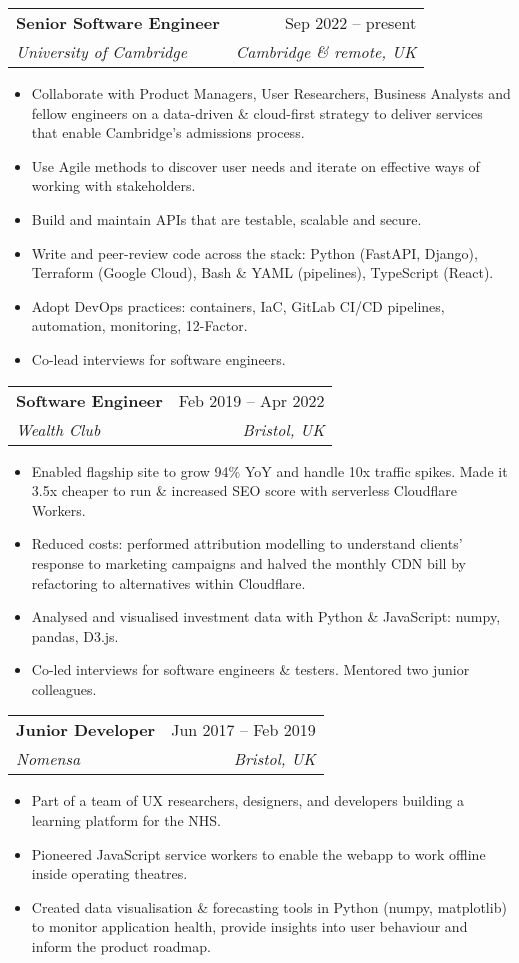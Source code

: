 \documentclass[a4paper,12pt]{article}
\makeatletter
\newcommand{\resumeItem}[1]{
  \item\small{
    {#1 \vspace{-2pt}}
  }
}
\newcommand{\resumeSubheading}[4]{
  \vspace{-2pt}\item
    \begin{tabular*}{0.97\textwidth}[t]{l@{\extracolsep{\fill}}r}
      \textbf{#1} & #2 \\
      \textit{\small#3} & \textit{\small #4} \\
    \end{tabular*}\vspace{-7pt}
}
\newcommand{\resumeItemListStart}{\begin{itemize}}
\newcommand{\resumeItemListEnd}{\end{itemize}\vspace{-5pt}}
\makeatother
\begin{document}
    \resumeSubheading
      {Senior Software Engineer}{Sep 2022 -- present}
      {University of Cambridge}{Cambridge \& remote, UK}
      \vspace{0pt}
    \resumeItemListStart
        \resumeItem{Collaborate with Product Managers, User Researchers, Business Analysts and fellow engineers on a data-driven \& cloud-first strategy to deliver services that enable Cambridge's admissions process.}
        \resumeItem{Use Agile methods to discover user needs and iterate on effective ways of working with stakeholders.}
        \resumeItem{Build and maintain APIs that are testable, scalable and secure.}
        \resumeItem{Write and peer-review code across the stack: Python (FastAPI, Django), Terraform (Google Cloud), Bash \& YAML (pipelines), TypeScript (React).}
        \resumeItem{Adopt DevOps practices: containers, IaC, GitLab CI/CD pipelines, automation, monitoring, 12-Factor.}
        \resumeItem{Co-lead interviews for software engineers.}
    \resumeItemListEnd
      \vspace{4pt}

    \resumeSubheading
      {Software Engineer}{Feb 2019 -- Apr 2022}
      {Wealth Club}{Bristol, UK}
      \vspace{0pt}
    \resumeItemListStart
        \resumeItem{Enabled flagship site to grow 94\% YoY and handle 10x traffic spikes. Made it 3.5x cheaper to run \& increased SEO score with serverless Cloudflare Workers.}
        \resumeItem{Reduced costs: performed attribution modelling to understand clients' response to marketing campaigns and halved the monthly CDN bill by refactoring to alternatives within Cloudflare.}
        \resumeItem{Analysed and visualised investment data with Python \& JavaScript: numpy, pandas, D3.js.}
        \resumeItem{Co-led interviews for software engineers \& testers. Mentored two junior colleagues.}
    \resumeItemListEnd
      \vspace{4pt}

    \resumeSubheading
      {Junior Developer}{Jun 2017 -- Feb 2019}
      {Nomensa}{Bristol, UK}
      \vspace{0pt}
    \resumeItemListStart
        \resumeItem{Part of a team of UX researchers, designers, and developers building a learning platform for the NHS.}
        \resumeItem{Pioneered JavaScript service workers to enable the webapp to work offline inside operating theatres.}
        \resumeItem{Created data visualisation \& forecasting tools in Python (numpy, matplotlib) to monitor application health, provide insights into user behaviour and inform the product roadmap.}
    \resumeItemListEnd
\end{document}
